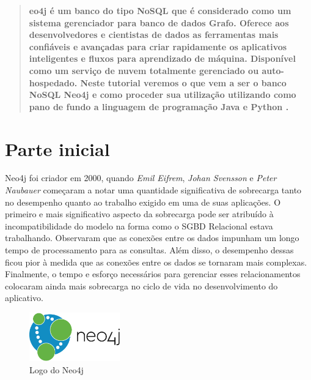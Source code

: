\documentclass[a4paper,11pt]{article}
\begin{document}
	
\maketitle %
\thispagestyle{fancy} %

	
\begin{abstract}
	\textbf{eo4j é um banco do tipo NoSQL que é considerado como um sistema gerenciador para banco de dados Grafo. Oferece aos desenvolvedores e cientistas de dados as ferramentas mais confiáveis e avançadas para criar rapidamente os aplicativos inteligentes e fluxos para aprendizado de máquina. Disponível como um serviço de nuvem totalmente gerenciado ou auto-hospedado. Neste tutorial veremos o que vem a ser o banco NoSQL Neo4j \cite{neo4joficial} e como proceder sua utilização utilizando como pano de fundo a linguagem de programação Java \cite{javaoficial} e Python \cite{pythonoficial}.}
\end{abstract}


\section{Parte inicial}
Neo4j foi criador em 2000, quando \textit{Emil Eifrem}, \textit{Johan Svensson} e \textit{Peter Naubauer} começaram a notar uma quantidade significativa de sobrecarga tanto no desempenho quanto ao trabalho exigido em uma de suas aplicações. O primeiro e mais significativo aspecto da sobrecarga pode ser atribuído à incompatibilidade do modelo na forma como o SGBD Relacional estava trabalhando. Observaram que as conexões entre os dados impunham um longo tempo de processamento para as consultas. Além disso, o desempenho dessas ficou pior à medida que as conexões entre os dados se tornaram mais complexas. Finalmente, o tempo e esforço necessários para gerenciar esses relacionamentos colocaram ainda mais sobrecarga no ciclo de vida no desenvolvimento do aplicativo.
\begin{figure}[H]
	\centering
	\includegraphics[width=0.35\textwidth]{imagens/neo4jlogo}
	\caption{Logo do Neo4j}
\end{figure}
\end{document}
